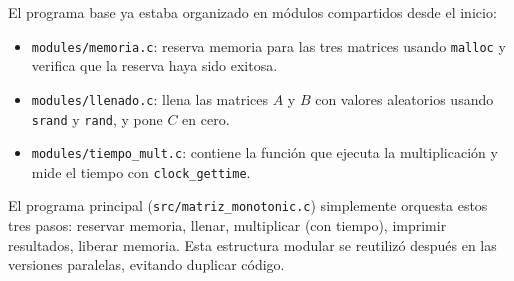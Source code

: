El programa base ya estaba organizado en módulos compartidos desde el inicio:

\begin{itemize}
    \item \texttt{modules/memoria.c}: reserva memoria para las tres matrices usando \texttt{malloc} y verifica que la reserva haya sido exitosa.
    \item \texttt{modules/llenado.c}: llena las matrices $A$ y $B$ con valores aleatorios usando \texttt{srand} y \texttt{rand}, y pone $C$ en cero.
    \item \texttt{modules/tiempo\_mult.c}: contiene la función que ejecuta la multiplicación y mide el tiempo con \texttt{clock\_gettime}.
\end{itemize}

El programa principal (\texttt{src/matriz\_monotonic.c}) simplemente orquesta estos tres pasos: reservar memoria, llenar, multiplicar (con tiempo), imprimir resultados, liberar memoria. Esta estructura modular se reutilizó después en las versiones paralelas, evitando duplicar código.